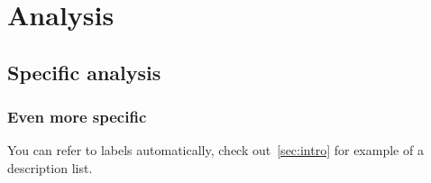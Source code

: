 \section{Analysis}
\lipsum[]

\subsection{Specific analysis}
\lipsum[]

\subsubsection{Even more specific}
\lipsum[]

\lipsum[]

\newpage
{}
You can refer to labels automatically, check out~\autoref{sec:intro} for example of a description list.